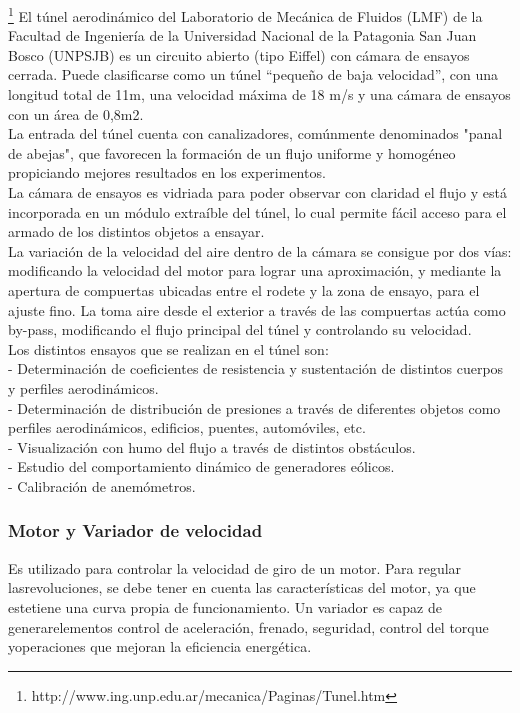 \footnote{http://www.ing.unp.edu.ar/mecanica/Paginas/Tunel.htm} 
	El túnel aerodinámico del Laboratorio de Mecánica de Fluidos (LMF) de la Facultad de Ingeniería de la Universidad Nacional de la Patagonia San Juan Bosco (UNPSJB) es un circuito abierto (tipo Eiffel) con cámara de ensayos cerrada. Puede clasificarse como un túnel “pequeño de baja velocidad”, con una longitud total de 11m, una velocidad máxima de 18 m/s y una cámara de ensayos con un área de 0,8m2.
	\\
	La entrada del túnel cuenta con canalizadores, comúnmente denominados "panal de abejas", que favorecen la formación de un flujo uniforme y homogéneo propiciando mejores resultados en los experimentos.
	\\
	La cámara de ensayos es vidriada para poder observar con claridad el flujo y está incorporada en un módulo extraíble del túnel, lo cual permite fácil acceso para el armado de los distintos objetos a ensayar.
	\\
	La variación de la velocidad del aire dentro de la cámara se consigue por dos vías: modificando la velocidad del motor para lograr una aproximación, y mediante la apertura de compuertas ubicadas entre el rodete y la zona de ensayo, para el ajuste fino. La toma aire desde el exterior a través de las compuertas actúa como by-pass, modificando el flujo principal del túnel y controlando su velocidad.
	\\
	Los distintos ensayos que se realizan en el túnel son:
	\\
	- Determinación de coeficientes de resistencia y sustentación de distintos cuerpos y perfiles aerodinámicos. \\
	- Determinación de distribución de presiones a través de diferentes objetos como perfiles aerodinámicos, edificios, puentes, automóviles, etc. \\
	- Visualización con humo del flujo a través de distintos obstáculos. \\
	- Estudio del comportamiento dinámico de generadores eólicos. \\
	- Calibración de anemómetros. 
	\\
		\subsubsection{Motor y Variador de velocidad}
		\begin{tcolorbox}[colback=blue!5!white,colframe=blue!75!black,title=Variador de velocidad]
			Es utilizado para controlar la velocidad de giro de un motor. Para regular lasrevoluciones, se debe tener en cuenta las características del motor, ya que estetiene  una  curva  propia  de  funcionamiento.  Un  variador  es  capaz  de  generarelementos  control  de  aceleración,  frenado,  seguridad,  control  del  torque  yoperaciones que mejoran la eficiencia energética.\end{tcolorbox}	

